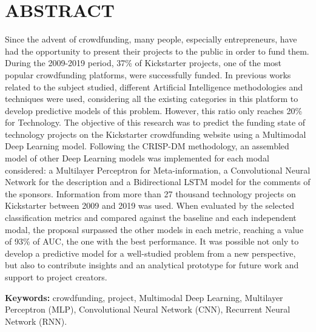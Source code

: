 \chapter*{ABSTRACT}
Since the advent of crowdfunding, many people, especially entrepreneurs, have had the opportunity to present their projects to the public in order to fund them. During the 2009-2019 period, 37\% of Kickstarter projects, one of the most popular crowdfunding platforms, were successfully funded. In previous works related to the subject studied, different Artificial Intelligence methodologies and techniques were used, considering all the existing categories in this platform to develop predictive models of this problem. However, this ratio only reaches 20\% for Technology. The objective of this research was to predict the funding state of technology projects on the Kickstarter crowdfunding website using a Multimodal Deep Learning model. Following the CRISP-DM methodology, an assembled model of other Deep Learning models was implemented for each modal considered: a Multilayer Perceptron for Meta-information, a Convolutional Neural Network for the description and a Bidirectional LSTM model for the comments of the sponsors. Information from more than 27 thousand technology projects on Kickstarter between 2009 and 2019 was used. When evaluated by the selected classification metrics and compared against the baseline and each independent modal, the proposal surpassed the other models in each metric, reaching a value of 93\% of AUC, the one with the best performance. It was possible not only to develop a predictive model for a well-studied problem from a new perspective, but also to contribute insights and an analytical prototype for future work and support to project creators.

\textbf{Keywords: } crowdfunding, project, Multimodal Deep Learning, Multilayer Perceptron (MLP), Convolutional Neural Network (CNN), Recurrent Neural Network (RNN).